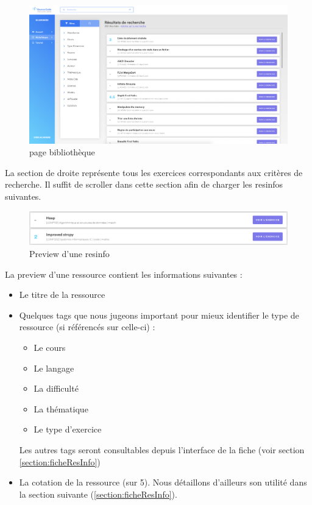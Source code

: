 \begin{figure}[H]
    \includegraphics[width=\textwidth,height=\textheight,keepaspectratio]{images/client/library.png}
    \centering
    \caption[SourceCode : page bibliothèque]{page bibliothèque}
\end{figure}



La section de droite représente tous les exercices correspondants aux critères de recherche. Il suffit de scroller dans cette section afin de charger les \glspl{resinfo} suivantes.\\

\begin{figure}[H]
    \includegraphics[width=\textwidth,height=\textheight,keepaspectratio]{images/client/preview-exercise.png}
    \centering
    \caption[SourceCode : preview d'une \gls{resinfo}]{Preview d'une \gls{resinfo}}
\end{figure}

La preview d'une ressource contient les informations suivantes :

\begin{itemize}
    \item Le titre de la ressource
    \item Quelques \glspl{tag} que nous jugeons important pour mieux identifier le type de ressource (si référencés sur celle-ci) : 
    \begin{itemize}
        \item Le cours
        \item Le langage
        \item La difficulté
        \item La thématique
        \item Le type d'exercice
    \end{itemize}
    Les autres \glspl{tag} seront consultables depuis l'interface de la \gls{fiche} (voir section \ref{section:ficheResInfo})
    \item La cotation de la ressource (sur 5). Nous détaillons d'ailleurs son utilité dans la section suivante (\ref{section:ficheResInfo}).
\end{itemize}

